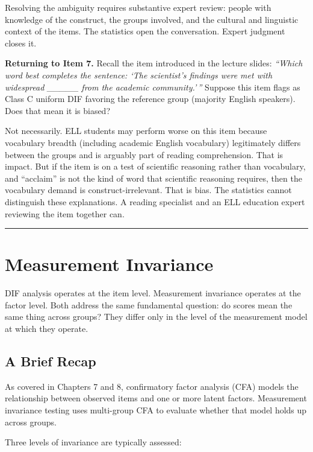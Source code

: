 \documentclass[
  11pt,
  letterpaper,
]{scrbook}
\begin{document}
Resolving the ambiguity requires substantive expert review: people with
knowledge of the construct, the groups involved, and the cultural and
linguistic context of the items. The statistics open the conversation.
Expert judgment closes it.

\textbf{Returning to Item 7.} Recall the item introduced in the lecture
slides: \emph{``Which word best completes the sentence: `The scientist's
findings were met with widespread \_\_\_\_\_ from the academic
community.'\,''} Suppose this item flags as Class C uniform DIF favoring
the reference group (majority English speakers). Does that mean it is
biased?

Not necessarily. ELL students may perform worse on this item because
vocabulary breadth (including academic English vocabulary) legitimately
differs between the groups and is arguably part of reading
comprehension. That is impact. But if the item is on a test of
scientific reasoning rather than vocabulary, and ``acclaim'' is not the
kind of word that scientific reasoning requires, then the vocabulary
demand is construct-irrelevant. That is bias. The statistics cannot
distinguish these explanations. A reading specialist and an ELL
education expert reviewing the item together can.

\begin{center}\rule{0.5\linewidth}{0.5pt}\end{center}

\section{Measurement Invariance}\label{measurement-invariance}

DIF analysis operates at the item level. Measurement invariance operates
at the factor level. Both address the same fundamental question: do
scores mean the same thing across groups? They differ only in the level
of the measurement model at which they operate.

\subsection{A Brief Recap}\label{a-brief-recap}

As covered in Chapters 7 and 8, confirmatory factor analysis (CFA)
models the relationship between observed items and one or more latent
factors. Measurement invariance testing uses multi-group CFA to evaluate
whether that model holds up across groups.

Three levels of invariance are typically assessed:
\end{document}
